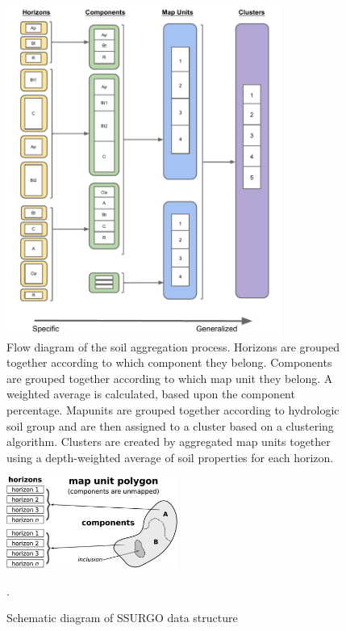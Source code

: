 \begin{figure}[H]
	\centering
	\includegraphics[width=0.8\textwidth]{./img/aggregation_flow_diagram}
	\caption[Flow diagram of the soil aggregation process]{Flow diagram of the soil aggregation process. Horizons are grouped together according to which component they belong. Components are grouped together according to which map unit they  belong. A weighted average is calculated, based upon the component percentage. Mapunits are grouped together according to hydrologic soil group  and are then assigned to a cluster based on a clustering algorithm. Clusters are created by aggregated map units together using a depth-weighted average of soil properties for each horizon.}
	\label{fig:agg_flow_diagram}
\end{figure}

\begin{figure}[h]
\centering
 \includegraphics[width=0.5\textwidth]{./img/ssurgo_data_structure_schematic.jpeg}
	\caption[Schematic diagram of SSURGO data structure]{Schematic diagram of SSURGO data structure \cite{gatzke_aggregation_2011}}.
	\label{fig:ssurgo_schematic}
\end{figure}


